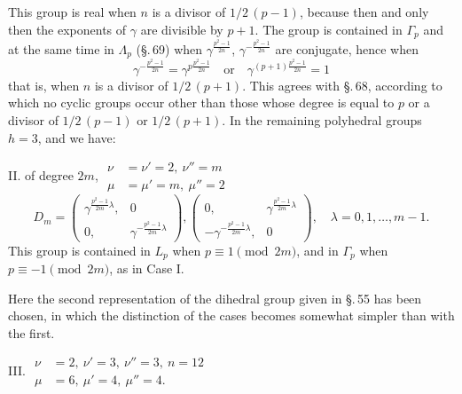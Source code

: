 This group is real when $n$ is a divisor of $1/2\,(p-1)$, because
then and only then the exponents of $\gamma$ are divisible by $p+1$.
The group is contained in $\Gamma_p$ and at the same time in $\Lambda_p$ (\S.\,69)
when $\gamma^{\frac{p^2-1}{2n}}$, $\gamma^{-\frac{p^2-1}{2n}}$
are conjugate, hence when
\[
\gamma^{-\frac{p^2-1}{2n}} = \gamma^{p\frac{p^2-1}{2n}}
\quad \text{or} \quad
\gamma^{(p+1)\frac{p^2-1}{2n}} = 1
\]
that is, when $n$ is a divisor of $1/2\,(p+1)$. This agrees with
\S.\,68, according to which no cyclic groups occur other than those
whose degree is equal to $p$ or a divisor of $1/2\,(p-1)$ or $1/2\,(p+1)$.
In the remaining polyhedral groups $h = 3$, and
we have:

II.  of degree $2m$,\quad
$\begin{aligned} \nu &= \nu' = 2,\ \nu'' = m \\ \mu &= \mu' = m,\ \mu'' = 2 \end{aligned}$
\[
D_m = \begin{pmatrix} \gamma^{\frac{p^2-1}{2m}\lambda}, & 0 \\[2pt] 0, & \gamma^{-\frac{p^2-1}{2m}\lambda} \end{pmatrix},
\begin{pmatrix} 0, & \gamma^{\frac{p^2-1}{2m}\lambda} \\[2pt] -\gamma^{-\frac{p^2-1}{2m}\lambda}, & 0 \end{pmatrix},
\quad \lambda = 0, 1, \ldots, m-1.
\]
This group is contained in $L_p$ when $p \equiv 1 \pmod{2m}$, and
in $\Gamma_p$ when $p \equiv -1 \pmod{2m}$, as in Case I.

Here the second representation of the dihedral group given in \S.\,55
has been chosen, in which the distinction of the cases becomes somewhat
simpler than with the first.

III. \quad
$\begin{aligned} \nu &= 2,\ \nu' = 3,\ \nu'' = 3,\ n = 12 \\ \mu &= 6,\ \mu' = 4,\ \mu'' = 4. \end{aligned}$

